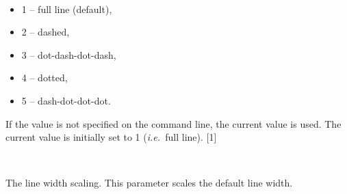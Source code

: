 \documentclass[twoside,11pt]{article}
\renewcommand{\_}{\texttt{\symbol{95}}}
\newcommand{\ie}{{\em i.e.\ }}
\newcommand{\sstsubsection}[1]{ \item[{#1}] \mbox{} \\}
\newcommand{\sstitemlist}[1]{
  \mbox{} \\
  \vspace{-3.5ex}
  \begin{itemize}
     #1
  \end{itemize}
}
\newcommand{\sstitem}{\item}
\newcommand{\sstsubsection}[1]{\item[{#1}]}
\newcommand{\sstitemlist}[1]{
      \begin{itemize}
         #1
      \end{itemize}
      \\
   }
\newcommand{\sstitem}{\item}
\begin{document}
\begin{sloppypar}
{{{         \sstitemlist{

            \sstitem
               1 -- full line (default),

            \sstitem
               2 -- dashed,

            \sstitem
               3 -- dot-dash-dot-dash,

            \sstitem
               4 -- dotted,

            \sstitem
               5 -- dash-dot-dot-dot.

         }
         If the value is not specified on the command line, the current
         value is used. The current value is initially set to 1 
         (\ie full line).
         [1]
      }
      \sstsubsection{
         LINEWID = \_INTEGER (Read)
      }{
         The line width scaling. This parameter scales the default line
         width.

}}}
\end{sloppypar}
\end{document}
